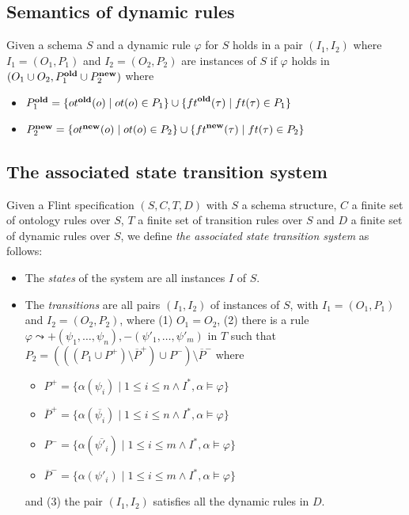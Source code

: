 \documentclass[11pt]{amsart}
\newcommand{\flint}{{\sc Flint}}
\newcommand{\old}[1]{{#1}^{\textrm{\textbf{old}}}}
\newcommand{\new}[1]{{#1}^{\textrm{\textbf{new}}}}
\begin{document}
\subsection{Semantics of dynamic rules} Given a schema $S$ and a dynamic rule $\varphi$ for $S$ holds in a pair $(I_1, I_2)$ where $I_1 = (O_1, P_1)$ and $I_2 = (O_2, P_2)$ are instances of $S$ if $\varphi$ holds in $(O_1 \cup O_2, \old{P}_1 \cup \new{P}_2)$ where
\begin{itemize}
  \item $\old{P}_1 = \{ \old{ot}(o) \mid ot(o) \in P_1 \} \cup \{ \old{ft}(\tau) \mid ft(\tau) \in P_1 \}$
  \item $\new{P}_2 = \{ \new{ot}(o) \mid ot(o) \in P_2 \} \cup \{ \new{ft}(\tau) \mid ft(\tau) \in P_2 \}$
\end{itemize}

\subsection{The associated state transition system}

Given a \flint{} specification $(S, C, T, D)$ with $S$ a schema structure, $C$ a finite set of ontology rules over $S$, $T$ a finite set of transition rules over $S$ and $D$ a finite set of dynamic rules over $S$, we define \emph{the associated state transition system} as follows:
\begin{itemize}

  \item The \emph{states} of the system are all instances $I$ of $S$.
  
  \item The \emph{transitions} are all pairs  $(I_1, I_2)$ of instances of $S$, with $I_1= (O_1, P_1) $ and $I_2 = (O_2, P_2)$, where (1) $O_1 = O_2$, (2) there is a  rule $\varphi \leadsto +(\psi_1, \ldots, \psi_n), -(\psi'_1, \ldots, \psi'_m)$ in $T$ such that $P_2 = (((P_1 \cup P^+) \setminus \overline{P}^+) \cup P^- ) \setminus \overline{P}^-$ where
       \begin{itemize}
     \item  $P^+ = \{ \alpha(\psi_i) \mid {1 \leq i \leq n} \wedge {I^*, \alpha \models \varphi} \}$
     \item $\overline{P}^+ =  \{ \alpha(\overline{\psi_i}) \mid {1 \leq i \leq n} \wedge {I^*, \alpha \models \varphi} \}$
     \item  $P^- = \{ \alpha(\overline{\psi'_i}) \mid {1 \leq i \leq m} \wedge {I^*, \alpha \models \varphi} \}$
     \item $\overline{P}^- =  \{ \alpha({\psi'_i}) \mid {1 \leq i \leq m} \wedge {I^*, \alpha \models \varphi} \}$
       \end{itemize}
   and (3) the pair $(I_1, I_2)$ satisfies all the dynamic rules in $D$.
 \end{itemize}
\end{document}
